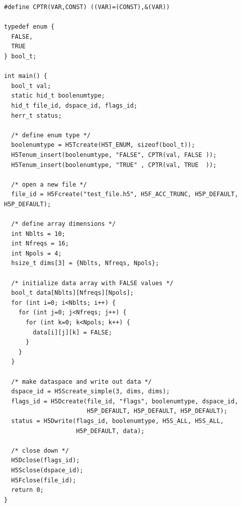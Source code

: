 \documentclass[11pt, oneside]{article}
\begin{document}
\begin{appendices}
\begin{verbatim}
#define CPTR(VAR,CONST) ((VAR)=(CONST),&(VAR))

typedef enum {
  FALSE,
  TRUE
} bool_t;

int main() {
  bool_t val;
  static hid_t boolenumtype;
  hid_t file_id, dspace_id, flags_id;
  herr_t status;

  /* define enum type */
  boolenumtype = H5Tcreate(H5T_ENUM, sizeof(bool_t));
  H5Tenum_insert(boolenumtype, "FALSE", CPTR(val, FALSE ));
  H5Tenum_insert(boolenumtype, "TRUE" , CPTR(val, TRUE  ));

  /* open a new file */
  file_id = H5Fcreate("test_file.h5", H5F_ACC_TRUNC, H5P_DEFAULT, H5P_DEFAULT);

  /* define array dimensions */
  int Nblts = 10;
  int Nfreqs = 16;
  int Npols = 4;
  hsize_t dims[3] = {Nblts, Nfreqs, Npols};

  /* initialize data array with FALSE values */
  bool_t data[Nblts][Nfreqs][Npols];
  for (int i=0; i<Nblts; i++) {
    for (int j=0; j<Nfreqs; j++) {
      for (int k=0; k<Npols; k++) {
        data[i][j][k] = FALSE;
      }
    }
  }

  /* make dataspace and write out data */
  dspace_id = H5Screate_simple(3, dims, dims);
  flags_id = H5Dcreate(file_id, "flags", boolenumtype, dspace_id,
                       H5P_DEFAULT, H5P_DEFAULT, H5P_DEFAULT);
  status = H5Dwrite(flags_id, boolenumtype, H5S_ALL, H5S_ALL,
                    H5P_DEFAULT, data);

  /* close down */
  H5Dclose(flags_id);
  H5Sclose(dspace_id);
  H5Fclose(file_id);
  return 0;
}
\end{verbatim}


\end{appendices}
\end{document}
